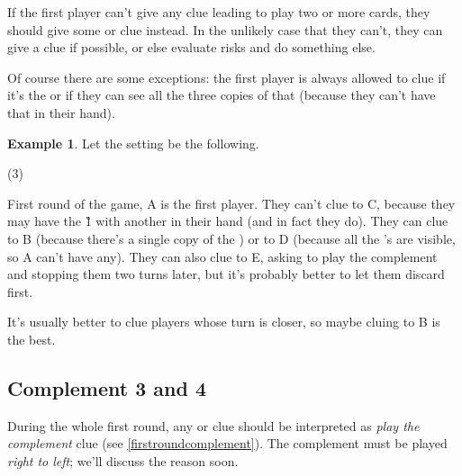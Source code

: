 \documentclass[a4paper]{article}
\theoremstyle{plain}
\theoremstyle{definition}
\newtheorem{example}[theorem]{Example}
\begin{document}
If the first player can't give any clue leading to play two or more cards, they should give some  or  clue instead. In the unlikely case that they can't, they can give a  clue if possible, or else evaluate risks and do something else.

Of course there are some exceptions: the first player is always allowed to clue  if it's the  or if they can see all the three copies of that  (because they can't have that  in their hand).

\begin{example}
	
	Let the setting be the following.
	
	\begin{tasks}(3)
		\task[+]      
		\task[A]    
		\task[B]    
		\task[C]    
		\task[D]    
		\task[E]    
	\end{tasks}
	
	First round of the game, A is the first player. They can't clue  to C, because they may have the \G{1} with another  in their hand (and in fact they do). They can clue  to B (because there's a single copy of the ) or to D (because all the 's are visible, so A can't have any). They can also clue  to E, asking to play the complement and stopping them two turns later, but it's probably better to let them discard first.
	
	It's usually better to clue players whose turn is closer, so maybe cluing  to B is the best.
\end{example}

\subsection{Complement 3 and 4}

During the whole first round, any  or  clue should be interpreted as \textit{play the complement} clue (see \ref{firstroundcomplement}). The complement must be played \textit{right to left}; we'll discuss the reason soon.
\end{document}
